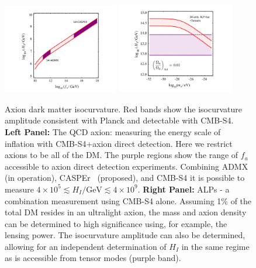 \begin{figure}[htbp!]
\begin{center}
\includegraphics[trim= 2cm 0 2cm 0,clip, width=0.45\textwidth]{Inflation/admx_casper_labelled.pdf} 
\includegraphics[trim= 2cm 0.45cm 2cm 0,clip, width=0.4585\textwidth]{Inflation/alp_iso_labelled.pdf}
 \end{center}
 \caption{Axion dark matter isocurvature. Red bands show the isocurvature amplitude consistent with Planck and detectable with CMB-S4. \textbf{Left Panel:} The QCD axion: measuring the energy scale of inflation with CMB-S4+axion direct detection. Here we restrict axions to be all of the DM. The purple regions show the range of $f_a$ accessible to axion direct detection experiments. Combining ADMX~\cite{Asztalos:2009yp} (in operation), CASPEr~\cite{Budker:2013hfa} (proposed), and CMB-S4 it is possible to measure $4\times 10^5\lesssim H_I/\text{GeV}\lesssim 4\times 10^9$. \textbf{Right Panel:} ALPs - a combination measurement using CMB-S4 alone. Assuming 1\% of the total DM resides in an ultralight axion, the mass and axion density can be determined to high significance using, for example, the lensing power. The isocurvature amplitude can also be determined, allowing for an independent determination of $H_I$ in the same regime as is accessible from tensor modes (purple band).}
\label{fig:qcd_isocurvature}
\end{figure} 

